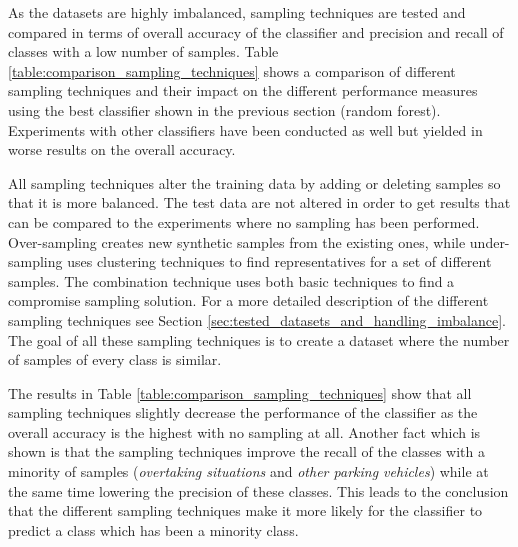 As the datasets are highly imbalanced, sampling techniques are tested and compared in terms of overall accuracy of the classifier and precision and recall of classes with a low number of samples. Table \ref{table:comparison_sampling_techniques} shows a comparison of different sampling techniques and their impact on the different performance measures using the best classifier shown in the previous section (random forest). Experiments with other classifiers have been conducted as well but yielded in worse results on the overall accuracy.

All sampling techniques alter the training data by adding or deleting samples so that it is more balanced. The test data are not altered in order to get results that can be compared to the experiments where no sampling has been performed.
Over-sampling creates new synthetic samples from the existing ones, while under-sampling uses clustering techniques to find representatives for a set of different samples. The combination technique uses both basic techniques to find a compromise sampling solution. For a more detailed description of the different sampling techniques see Section \ref{sec:tested_datasets_and_handling_imbalance}. The goal of all these sampling techniques is to create a dataset where the number of samples of every class is similar. 

The results in Table \ref{table:comparison_sampling_techniques} show that all sampling techniques slightly decrease the performance of the classifier as the overall accuracy is the highest with no sampling at all. Another fact which is shown is that the sampling techniques improve the recall of the classes with a minority of samples (\emph{overtaking situations} and \emph{other parking vehicles}) while at the same time lowering the precision of these classes. This leads to the conclusion that the different sampling techniques make it more likely for the classifier to predict a class which has been a minority class.

